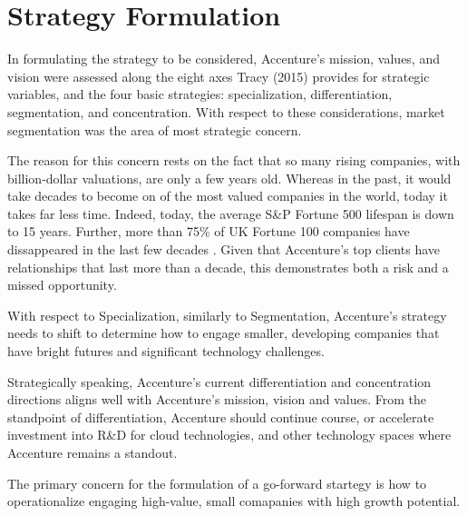 \section{Strategy Formulation}

In formulating the strategy to be considered, Accenture's mission, values, and vision were assessed along the eight axes Tracy (2015) provides for strategic variables, and the four basic strategies: specialization, differentiation, segmentation, and concentration. With respect to these considerations, market segmentation was the area of most strategic concern.

The reason for this concern rests on the fact that so many rising companies, with billion-dollar valuations, are only a few years old. Whereas in the past, it would take decades to become on of the most valued companies in the world, today it takes far less time. Indeed, today, the average S\&P Fortune 500 lifespan is down to 15 years. Further, more than 75\% of UK Fortune 100 companies have dissappeared in the last few decades \parencite{hillHowWinningOrganizations2018}. Given that Accenture's top clients have relationships that last more than a decade, this demonstrates both a risk and a missed opportunity.

With respect to Specialization, similarly to Segmentation, Accenture's strategy needs to shift to determine how to engage smaller, developing companies that have bright futures and significant technology challenges.

Strategically speaking, Accenture's current differentiation and concentration directions aligns well with Accenture's mission, vision and values. From the standpoint of differentiation, Accenture should continue course, or accelerate investment into R\&D for cloud technologies, and other technology spaces where Accenture remains a standout.

The primary concern for the formulation of a go-forward startegy is how to operationalize engaging high-value, small comapanies with high growth potential.

